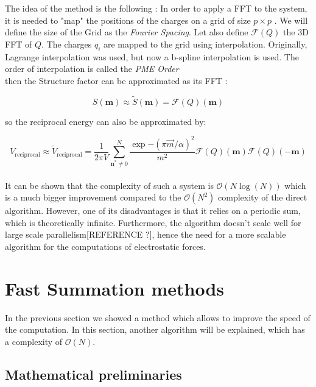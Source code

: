 \documentclass[10pt,twoside,a4paper]{report}
\begin{document}
The idea of the method is the following : In order to apply a FFT to the system, it is needed to "map" the positions of the charges on a grid of size $ p \times p $ . We will define the size of the Grid as the \textit{Fourier Spacing}. Let also define $\mathcal{F}(Q)$ the 3D FFT of $Q$. The charges $q_i$ are mapped to the grid using interpolation. 
Originally, Lagrange interpolation was used, but now a b-spline interpolation is used. The order of interpolation is called the \textit{PME Order}\\

then the Structure factor can be approximated as its FFT :

\begin{equation}
   S(\textbf{m}) \approx \widetilde{S}(\textbf{m}) = \mathcal{F}(Q)(\textbf{m})
\end{equation}

so the reciprocal energy can also be approximated by:

\begin{equation}
   V_{\text{reciprocal}} \approx \widetilde{V}_{\text{reciprocal}}   =\frac{1}{2 \pi V} \sum\limits_{\textbf{n}^* \neq 0}^{N}  \frac{\exp{-(\pi \overrightarrow{m}/\alpha)^2}}{m^2}\mathcal{F}(Q)(\textbf{m})\mathcal{F}(Q)(-\textbf{m})
\end{equation} \\

It can be shown that the complexity of such a system is $\mathcal{O}(N \log(N))$ which is a much bigger improvement compared to the $\mathcal{O}(N^2)$ complexity of the direct algorithm. However, one of its disadvantages is that it relies on a periodic sum, which is theoretically infinite. Furthermore, the algorithm doesn't scale well for large scale parallelism[REFERENCE ?], hence the need for a more scalable algorithm for the computations of electrostatic forces.



\section{Fast Summation methods}

    In the previous section we showed a method which allows to improve the speed of the computation. In this section, another algorithm will be explained, which has a complexity of $\mathcal{O}(N)$.\\
    
	\subsection{Mathematical preliminaries}
	
\end{document}
